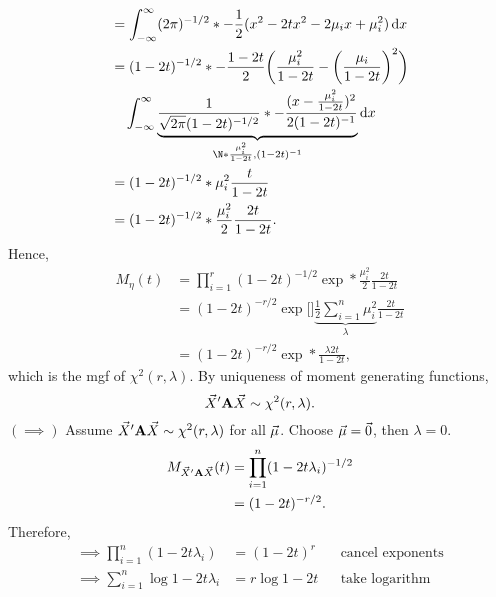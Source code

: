 \begin{Theorem}{}{}
\begin{align*}
             & =\int_{-\infty}^{\infty}(2\pi)^{-1/2}\exp*{-\frac{1}{2}(x^2-2tx^2-2\mu_i x+\mu_i^2)}\odif{x}                                                                                       \\
             & =(1-2t)^{-1/2}\exp*{-\frac{1-2t}{2}\biggl(\frac{\mu_i^2}{1-2t}-\biggl(\frac{\mu_i}{1-2t}\biggr)^2\biggr)}                                                                          \\
             & \quad\int_{-\infty}^{\infty}\underbrace{\frac{1}{\sqrt{2\pi}(1-2t)^{-1/2}}\exp*{-\frac{(x-\frac{\mu_i^2}{1-2t})^2}{2(1-2t)^{-1}}}}_{\N*{\frac{\mu_i^2}{1-2t},(1-2t)^{-1}}}\odif{x} \\
             & =(1-2t)^{-1/2}\exp*{\mu_i^2\frac{t}{1-2t}}                                                                                                                                         \\
             & =(1-2t)^{-1/2}\exp*{\frac{\mu_i^2}{2}\frac{2t}{1-2t}}.
      \end{align*}
      Hence,
      \begin{align*}
            M_\eta(t)
             & =\prod_{i=1}^{r}(1-2t)^{-1/2}\exp*{\frac{\mu_i^2}{2}\frac{2t}{1-2t}}                              \\
             & =(1-2t)^{-r/2}\exp[\bigg]{\underbrace{\frac{1}{2}\sum_{i=1}^{n}\mu_i^2}_{\lambda}\frac{2t}{1-2t}} \\
             & =(1-2t)^{-r/2}\exp*{\frac{\lambda 2t}{1-2t}},
      \end{align*}
      which is the mgf of $ \chi^2(r,\lambda) $. By uniqueness of moment generating functions,
      \[ \vec{X}'\mathbf{A}\vec{X}\sim \chi^2(r,\lambda). \]
      $ (\implies) $ Assume $ \vec{X}' \mathbf{A}\vec{X}\sim \chi^2(r,\lambda) $
      for all $ \vec{\mu} $. Choose $ \vec{\mu}=\vec{0} $, then $ \lambda=0 $.
      \begin{align*}
            M_{\vec{X}'\mathbf{A}\vec{X}}(t)
             & =\prod_{i=1}^n(1-2t\lambda_i)^{-1/2} \\
             & =(1-2t)^{-r/2}.
      \end{align*}
      Therefore,
      \begin{align*}
            \implies \prod_{i=1}^n(1-2t\lambda_i)                                                      & =(1-2t)^r                                       &  & \text{cancel exponents}   \\
            \implies \sum_{i=1}^{n}\log{1-2t\lambda_i}                                                 & =r\log{1-2t}                                    &  & \text{take logarithm}     \\

\end{align*}
\end{Theorem}
